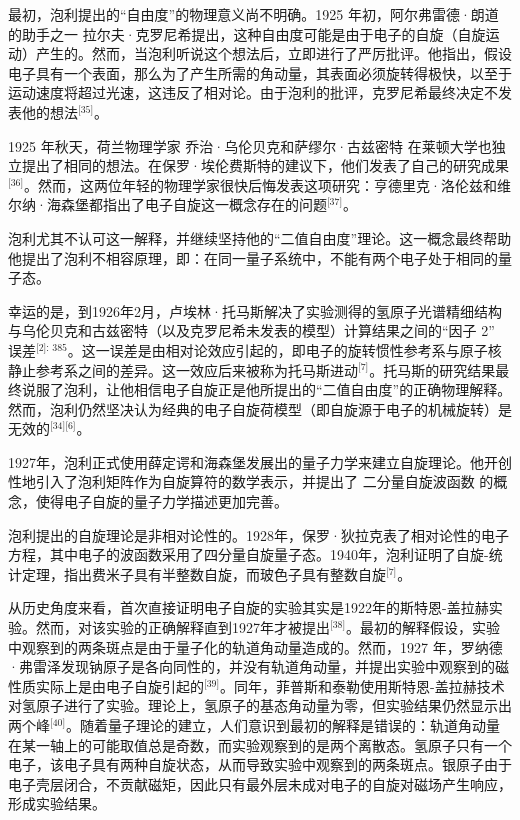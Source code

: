 最初，泡利提出的“自由度”的物理意义尚不明确。1925 年初，阿尔弗雷德·朗道的助手之一 拉尔夫·克罗尼希提出，这种自由度可能是由于电子的自旋（自旋运动）产生的。然而，当泡利听说这个想法后，立即进行了严厉批评。他指出，假设电子具有一个表面，那么为了产生所需的角动量，其表面必须旋转得极快，以至于运动速度将超过光速，这违反了相对论。由于泡利的批评，克罗尼希最终决定不发表他的想法\(^\text{[35]}\)。

1925 年秋天，荷兰物理学家 乔治·乌伦贝克和萨缪尔·古兹密特 在莱顿大学也独立提出了相同的想法。在保罗·埃伦费斯特的建议下，他们发表了自己的研究成果\(^\text{[36]}\)。然而，这两位年轻的物理学家很快后悔发表这项研究：亨德里克·洛伦兹和维尔纳·海森堡都指出了电子自旋这一概念存在的问题\(^\text{[37]}\)。  

泡利尤其不认可这一解释，并继续坚持他的“二值自由度”理论。这一概念最终帮助他提出了泡利不相容原理，即：在同一量子系统中，不能有两个电子处于相同的量子态。

幸运的是，到1926年2月，卢埃林·托马斯解决了实验测得的氢原子光谱精细结构与乌伦贝克和古兹密特（以及克罗尼希未发表的模型）计算结果之间的“因子 2” 误差\(^\text{[2]: 385}\)。这一误差是由相对论效应引起的，即电子的旋转惯性参考系与原子核静止参考系之间的差异。这一效应后来被称为托马斯进动\(^\text{[7]}\)。托马斯的研究结果最终说服了泡利，让他相信电子自旋正是他所提出的“二值自由度”的正确物理解释。然而，泡利仍然坚决认为经典的电子自旋荷模型（即自旋源于电子的机械旋转）是无效的\(^\text{[34][6]}\)。  

1927年，泡利正式使用薛定谔和海森堡发展出的量子力学来建立自旋理论。他开创性地引入了泡利矩阵作为自旋算符的数学表示，并提出了 二分量自旋波函数 的概念，使得电子自旋的量子力学描述更加完善。

泡利提出的自旋理论是非相对论性的。1928年，保罗·狄拉克表了相对论性的电子方程，其中电子的波函数采用了四分量自旋量子态。1940年，泡利证明了自旋-统计定理，指出费米子具有半整数自旋，而玻色子具有整数自旋\(^\text{[7]}\)。  

从历史角度来看，首次直接证明电子自旋的实验其实是1922年的斯特恩-盖拉赫实验。然而，对该实验的正确解释直到1927年才被提出\(^\text{[38]}\)。最初的解释假设，实验中观察到的两条斑点是由于量子化的轨道角动量造成的。然而，1927 年，罗纳德·弗雷泽发现钠原子是各向同性的，并没有轨道角动量，并提出实验中观察到的磁性质实际上是由电子自旋引起的\(^\text{[39]}\)。同年，菲普斯和泰勒使用斯特恩-盖拉赫技术对氢原子进行了实验。理论上，氢原子的基态角动量为零，但实验结果仍然显示出两个峰\(^\text{[40]}\)。随着量子理论的建立，人们意识到最初的解释是错误的：轨道角动量在某一轴上的可能取值总是奇数，而实验观察到的是两个离散态。氢原子只有一个电子，该电子具有两种自旋状态，从而导致实验中观察到的两条斑点。银原子由于电子壳层闭合，不贡献磁矩，因此只有最外层未成对电子的自旋对磁场产生响应，形成实验结果。